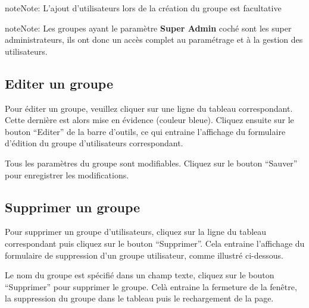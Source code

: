 \documentclass[letterpaper,10pt,french]{sphinxmanual}
\begin{document}
\begin{notice}{note}{Note:}
L'ajout d'utilisateurs lors de la création du groupe est facultative
\end{notice}

\begin{notice}{note}{Note:}
Les groupes ayant le paramètre \textbf{Super Admin} coché sont les super
administrateurs, ils ont donc un accès complet au paramétrage et à
la gestion des utilisateurs.
\end{notice}


\subsection{Editer un groupe}
\label{dashboard/usersmanagement:editer-un-groupe}
Pour éditer un groupe, veuillez cliquer sur une ligne du tableau
correspondant. Cette dernière est alors mise en évidence (couleur
bleue). Cliquez ensuite sur le bouton “Editer” de la barre d’outils,
ce qui entraine l’affichage du formulaire d’édition du groupe
d'utilisateurs correspondant.

Tous les paramètres du groupe sont modifiables. Cliquez sur le bouton
“Sauver” pour enregistrer les modifications.



\subsection{Supprimer un groupe}
\label{dashboard/usersmanagement:supprimer-un-groupe}
Pour supprimer un groupe d'utilisateurs, cliquez sur la ligne du
tableau correspondant puis cliquez sur le bouton “Supprimer”. Cela
entraine l’affichage du formulaire de suppression d’un groupe
utilisateur, comme illustré ci-dessous.


Le nom du groupe est spécifié dans un champ texte, cliquez sur le bouton ``Supprimer'' pour supprimer le groupe. Celà entraine la fermeture de la fenêtre, la suppression du groupe dans le tableau puis le rechargement de la page.
\end{document}
